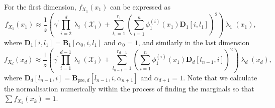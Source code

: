 For the first dimension, $f_{X_1}(x_1)$ can be expressed as
\begin{equation}
	f_{X_1}(x_1)  \approx \frac{1}{z} \left(\gamma^{\prime} \prod_{i=2}^{d} \uplambda_i(\mathcal{X}_i) + \sum_{l_1=1}^{r_1} \left(\sum_{i=1}^{n} \phi^{(i)}_1(x_1) \bm{D}_1[i, l_1] \right)^2 \right) \uplambda_1(x_1),
\end{equation}
where $\bm{D}_1[i, l_1] = \bm{B}_1[\alpha_0, i, l_1]$ and $\alpha_0 = 1$,
and similarly in the last dimension
\begin{equation}
	f_{X_d}(x_d)  \approx \frac{1}{z} \left(\gamma^{\prime} \prod_{i=1}^{d-1} \uplambda_i(\mathcal{X}_i) + \sum_{l_{n-1}=1}^{r_{d-1}} \left(\sum_{i=1}^{n} \phi^{(i)}_1(x_1) \bm{D}_d[l_{n-1},i] \right)^2 \right) \uplambda_d(x_d),
\end{equation}
where $\bm{D}_d[l_{n-1},i] = \bm{B}_{\text{pre},d}[l_{n-1}, i, \alpha_{n+1}]$ and $\alpha_{d+1} = 1$.
Note that we calculate the normalisation numerically within the process of finding the marginals so that $\sum f_{X_k}(x_k) = 1$.

%
%
%
%
%
%
%
%

